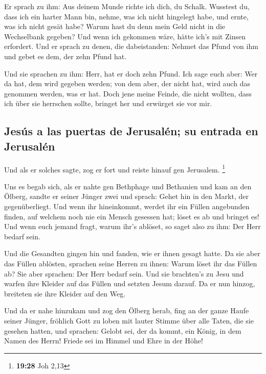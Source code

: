  Er sprach zu ihm: Aus deinem Munde richte ich dich, du
Schalk. Wusstest du, dass ich ein harter Mann bin, nehme, was ich nicht
hingelegt habe, und ernte, was ich nicht gesät habe? 
Warum hast du denn mein Geld nicht in die Wechselbank gegeben? Und wenn
ich gekommen wäre, hätte ich's mit Zinsen erfordert.  Und
er sprach zu denen, die dabeistanden: Nehmet das Pfund von ihm und gebet
es dem, der zehn Pfund hat.

 Und sie sprachen zu ihm: Herr, hat er doch zehn Pfund.
 Ich sage euch aber: Wer da hat, dem wird gegeben werden;
von dem aber, der nicht hat, wird auch das genommen werden, was er hat.
 Doch jene meine Feinde, die nicht wollten, dass ich über
sie herrschen sollte, bringet her und erwürget sie vor mir.

\hypertarget{jesuxfas-a-las-puertas-de-jerusaluxe9n-su-entrada-en-jerusaluxe9n}{%
\subsection{Jesús a las puertas de Jerusalén; su entrada en
Jerusalén}\label{jesuxfas-a-las-puertas-de-jerusaluxe9n-su-entrada-en-jerusaluxe9n}}

 Und als er solches sagte, zog er fort und reiste hinauf
gen Jerusalem. \footnote{\textbf{19:28} Joh 2,13}

 Uns es begab sich, als er nahte gen Bethphage und
Bethanien und kam an den Ölberg, sandte er seiner Jünger zwei
 und sprach: Gehet hin in den Markt, der gegenüberliegt.
Und wenn ihr hineinkommt, werdet ihr ein Füllen angebunden finden, auf
welchem noch nie ein Mensch gesessen hat; löset es ab und bringet es!
 Und wenn euch jemand fragt, warum ihr's ablöset, so
saget also zu ihm: Der Herr bedarf sein.

 Und die Gesandten gingen hin und fanden, wie er ihnen
gesagt hatte.  Da sie aber das Füllen ablösten, sprachen
seine Herren zu ihnen: Warum löset ihr das Füllen ab? 
Sie aber sprachen: Der Herr bedarf sein.  Und sie
brachten's zu Jesu und warfen ihre Kleider auf das Füllen und setzten
Jesum darauf.  Da er nun hinzog, breiteten sie ihre
Kleider auf den Weg.

 Und da er nahe hinzukam und zog den Ölberg herab, fing
an der ganze Haufe seiner Jünger, fröhlich Gott zu loben mit lauter
Stimme über alle Taten, die sie gesehen hatten,  und
sprachen: Gelobt sei, der da kommt, ein König, in dem Namen des Herrn!
Friede sei im Himmel und Ehre in der Höhe!

